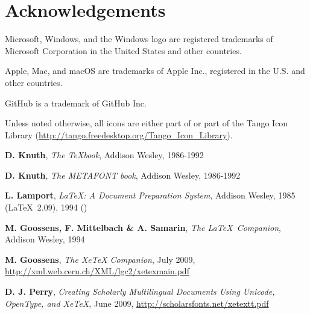 
\chapter*{Acknowledgements}

Microsoft, Windows, and the Windows logo are registered trademarks of Microsoft Corporation in the United States and other countries.

Apple, Mac, and macOS are trademarks of Apple Inc., registered in the U.S. and other countries.

GitHub is a trademark of GitHub Inc.

Unless noted otherwise, all icons are either part of {\Tw} or part of the Tango Icon Library (\url{http://tango.freedesktop.org/Tango_Icon_Library}).

\begin{thebibliography}{xx}
\textbf{D. Knuth}, \textsl{The \TeX book}, Addison Wesley, 1986-1992

\textbf{D. Knuth}, \textsl{The METAFONT book}, Addison Wesley, 1986-1992

\textbf{L. Lamport}, \textsl{\LaTeX: A Document Preparation System}, Addison Wesley, 1985 (\LaTeX\ 2.09), 1994 (\LaTeXe)

\textbf{M. Goossens, F. Mittelbach \& A. Samarin}, \textsl{The \LaTeX\ Companion}, Addison Wesley, 1994

\textbf{M. Goossens}, \textsl{The XeTeX Companion}, July 2009, \url{http://xml.web.cern.ch/XML/lgc2/xetexmain.pdf}

\textbf{D. J. Perry}, \textsl{Creating Scholarly Multilingual Documents Using Unicode, OpenType, and XeTeX}, June 2009, \url{http://scholarsfonts.net/xetextt.pdf}

\end{thebibliography}

\printindex
